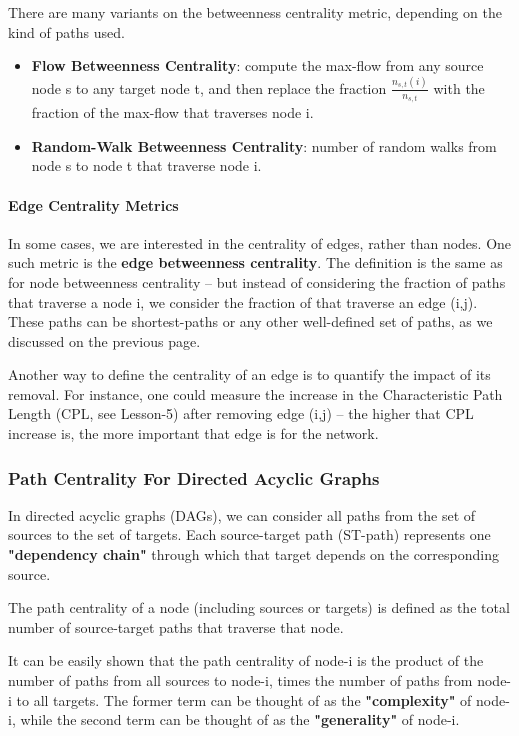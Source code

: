 \documentclass[11pt]{scrartcl} %
\begin{document}
There are many variants on the betweenness centrality metric, depending on the kind of paths used.
\begin{itemize}
	\item \textbf{Flow Betweenness Centrality}: compute the max-flow from any source node s to any target node t, and then replace the fraction $\frac{n_{s,t}(i)}{n_{s,t}}$ with the fraction of the max-flow that traverses node i.
	\item \textbf{Random-Walk Betweenness Centrality}: number of random walks from node s to node t that traverse node i.
\end{itemize}

\paragraph{Edge Centrality Metrics}
In some cases, we are interested in the centrality of edges, rather than nodes. One such metric is the \textbf{edge betweenness centrality}. The definition is the same as for node betweenness centrality – but instead of considering the fraction of paths that traverse a node i, we consider the fraction of that traverse an edge (i,j). These paths can be shortest-paths or any other well-defined set of paths, as we discussed on the previous page.

Another way to define the centrality of an edge is to quantify the impact of its removal. For instance, one could measure the increase in the Characteristic Path Length (CPL, see Lesson-5) after removing edge (i,j) – the higher that CPL increase is, the more important that edge is for the network.
 
\subsubsection{Path Centrality For Directed Acyclic Graphs}

In directed acyclic graphs (DAGs), we can consider all paths from the set of sources to the set of targets. Each source-target path (ST-path) represents one \textbf{"dependency chain"} through which that target depends on the corresponding source.

The path centrality of a node (including sources or targets) is defined as the total number of source-target paths that traverse that node.

It can be easily shown that the path centrality of node-i is the product of the number of paths from all sources to node-i, times the number of paths from node-i to all targets. The former term can be thought of as the \textbf{"complexity"} of node-i, while the second term can be thought of as the \textbf{"generality"} of node-i.
\end{document}
